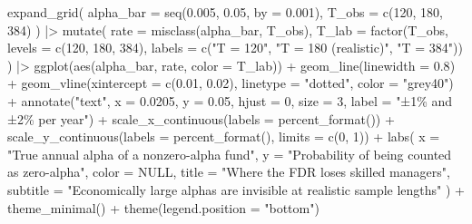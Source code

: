 \documentclass[
  letterpaper,
  DIV=11,
  numbers=noendperiod]{scrartcl}
\newenvironment{Shaded}{\begin{snugshade}}{\end{snugshade}}
\newcommand{\AttributeTok}[1]{\textcolor[rgb]{0.40,0.45,0.13}{#1}}
\newcommand{\ConstantTok}[1]{\textcolor[rgb]{0.56,0.35,0.01}{#1}}
\newcommand{\DecValTok}[1]{\textcolor[rgb]{0.68,0.00,0.00}{#1}}
\newcommand{\FloatTok}[1]{\textcolor[rgb]{0.68,0.00,0.00}{#1}}
\newcommand{\FunctionTok}[1]{\textcolor[rgb]{0.28,0.35,0.67}{#1}}
\newcommand{\NormalTok}[1]{\textcolor[rgb]{0.00,0.23,0.31}{#1}}
\newcommand{\SpecialCharTok}[1]{\textcolor[rgb]{0.37,0.37,0.37}{#1}}
\newcommand{\StringTok}[1]{\textcolor[rgb]{0.13,0.47,0.30}{#1}}
\begin{document}
\begin{Shaded}
\begin{Highlighting}[]
\FunctionTok{expand\_grid}\NormalTok{(}
  \AttributeTok{alpha\_bar =} \FunctionTok{seq}\NormalTok{(}\FloatTok{0.005}\NormalTok{, }\FloatTok{0.05}\NormalTok{, }\AttributeTok{by =} \FloatTok{0.001}\NormalTok{),}
  \AttributeTok{T\_obs     =} \FunctionTok{c}\NormalTok{(}\DecValTok{120}\NormalTok{, }\DecValTok{180}\NormalTok{, }\DecValTok{384}\NormalTok{)}
\NormalTok{) }\SpecialCharTok{|\textgreater{}}
  \FunctionTok{mutate}\NormalTok{(}
    \AttributeTok{rate  =} \FunctionTok{misclass}\NormalTok{(alpha\_bar, T\_obs),}
    \AttributeTok{T\_lab =} \FunctionTok{factor}\NormalTok{(T\_obs, }\AttributeTok{levels =} \FunctionTok{c}\NormalTok{(}\DecValTok{120}\NormalTok{, }\DecValTok{180}\NormalTok{, }\DecValTok{384}\NormalTok{),}
                   \AttributeTok{labels =} \FunctionTok{c}\NormalTok{(}\StringTok{"T = 120"}\NormalTok{, }\StringTok{"T = 180 (realistic)"}\NormalTok{, }\StringTok{"T = 384"}\NormalTok{))}
\NormalTok{  ) }\SpecialCharTok{|\textgreater{}}
  \FunctionTok{ggplot}\NormalTok{(}\FunctionTok{aes}\NormalTok{(alpha\_bar, rate, }\AttributeTok{color =}\NormalTok{ T\_lab)) }\SpecialCharTok{+}
  \FunctionTok{geom\_line}\NormalTok{(}\AttributeTok{linewidth =} \FloatTok{0.8}\NormalTok{) }\SpecialCharTok{+}
  \FunctionTok{geom\_vline}\NormalTok{(}\AttributeTok{xintercept =} \FunctionTok{c}\NormalTok{(}\FloatTok{0.01}\NormalTok{, }\FloatTok{0.02}\NormalTok{), }\AttributeTok{linetype =} \StringTok{"dotted"}\NormalTok{, }\AttributeTok{color =} \StringTok{"grey40"}\NormalTok{) }\SpecialCharTok{+}
  \FunctionTok{annotate}\NormalTok{(}\StringTok{"text"}\NormalTok{, }\AttributeTok{x =} \FloatTok{0.0205}\NormalTok{, }\AttributeTok{y =} \FloatTok{0.05}\NormalTok{, }\AttributeTok{hjust =} \DecValTok{0}\NormalTok{, }\AttributeTok{size =} \DecValTok{3}\NormalTok{,}
           \AttributeTok{label =} \StringTok{"±1\% and ±2\% per year"}\NormalTok{) }\SpecialCharTok{+}
  \FunctionTok{scale\_x\_continuous}\NormalTok{(}\AttributeTok{labels =} \FunctionTok{percent\_format}\NormalTok{()) }\SpecialCharTok{+}
  \FunctionTok{scale\_y\_continuous}\NormalTok{(}\AttributeTok{labels =} \FunctionTok{percent\_format}\NormalTok{(), }\AttributeTok{limits =} \FunctionTok{c}\NormalTok{(}\DecValTok{0}\NormalTok{, }\DecValTok{1}\NormalTok{)) }\SpecialCharTok{+}
  \FunctionTok{labs}\NormalTok{(}
    \AttributeTok{x =} \StringTok{"True annual alpha of a nonzero{-}alpha fund"}\NormalTok{,}
    \AttributeTok{y =} \StringTok{"Probability of being counted as zero{-}alpha"}\NormalTok{,}
    \AttributeTok{color =} \ConstantTok{NULL}\NormalTok{,}
    \AttributeTok{title =} \StringTok{"Where the FDR loses skilled managers"}\NormalTok{,}
    \AttributeTok{subtitle =} \StringTok{"Economically large alphas are invisible at realistic sample lengths"}
\NormalTok{  ) }\SpecialCharTok{+}
  \FunctionTok{theme\_minimal}\NormalTok{() }\SpecialCharTok{+}
  \FunctionTok{theme}\NormalTok{(}\AttributeTok{legend.position =} \StringTok{"bottom"}\NormalTok{)}
\end{Highlighting}
\end{Shaded}
\end{document}
